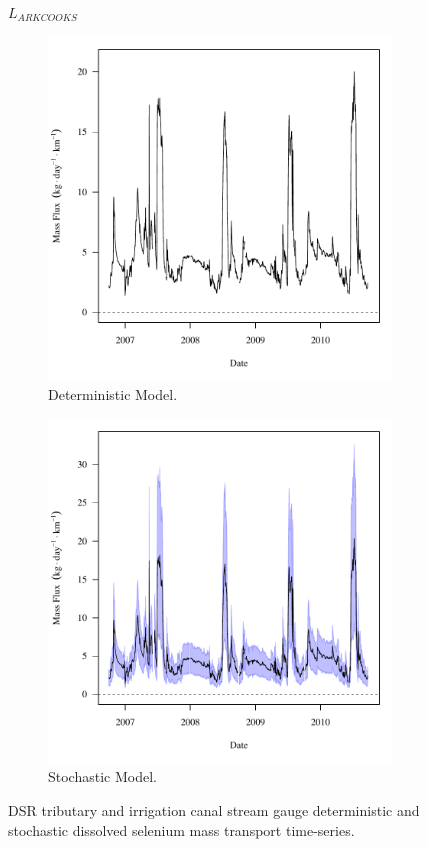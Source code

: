 \begin{landscape}
	\begin{figure}
		$ \displaystyle L_{ARKCOOKS} $
		\begin{subfigure}{0.7\textwidth}
			\centering
			\includegraphics[width=\tableCustomSize]{"Figures/Results_DSR/Deterministic/f D106C"}
			\caption{Deterministic Model.}
		\end{subfigure}%
		\begin{subfigure}{0.7\textwidth}
			\centering
			\includegraphics[width=\tableCustomSize]{"Figures/Results_DSR/Stochastic/f D106C"}
			\caption{Stochastic Model.}
		\end{subfigure}
		\caption{DSR tributary and irrigation canal stream gauge deterministic and stochastic dissolved selenium mass transport time-series.}
	\end{figure}
\end{landscape}
